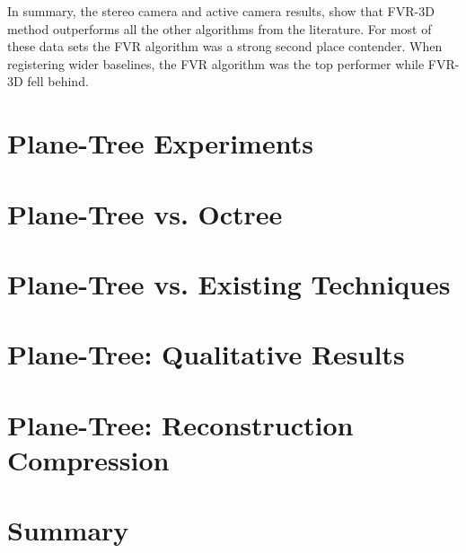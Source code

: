 In summary, the stereo camera and active camera results, show that FVR-3D method outperforms all the other algorithms from the literature. For most of these data sets the FVR algorithm was a strong second place contender. When registering wider baselines, the FVR algorithm was the top performer while FVR-3D fell behind.

\section{Plane-Tree Experiments}

\section{Plane-Tree vs. Octree}
\label{SEC:PTVSOT}

\section{Plane-Tree vs. Existing Techniques}
\label{SEC:PTVSSOTA}

\section{Plane-Tree: Qualitative Results}
\label{SEC:PTQUALEVAL}

\section{Plane-Tree: Reconstruction Compression}
\label{SEC:PTONRECON}


\section{Summary}


